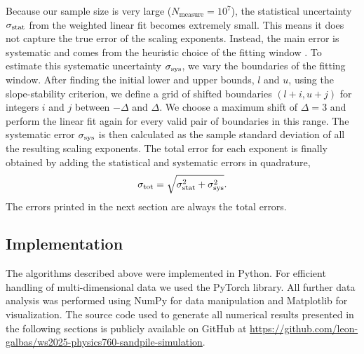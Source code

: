 Because our sample size is very large ($N_\mathrm{measure}=10^{7}$), the statistical uncertainty $\sigma_{\mathrm{stat}}$ from the weighted linear fit becomes extremely small. This means it does not capture the true error of the scaling exponents. Instead, the main error is systematic and comes from the heuristic choice of the fitting window \cite{pruessner2012numerical}. To estimate this systematic uncertainty $\sigma_{\mathrm{sys}}$, we vary the boundaries of the fitting window. After finding the initial lower and upper bounds, $l$ and $u$, using the slope-stability criterion, we define a grid of shifted boundaries $(l+i, u+j)$ for integers $i$ and $j$ between $-\Delta$ and $\Delta$. We choose a maximum shift of $\Delta=3$ and perform the linear fit again for every valid pair of boundaries in this range. The systematic error $\sigma_{\mathrm{sys}}$ is then calculated as the sample standard deviation of all the resulting scaling exponents. The total error for each exponent is finally obtained by adding the statistical and systematic errors in quadrature,
\begin{equation}
    \sigma_{\mathrm{tot}}=\sqrt{\sigma_{\mathrm{stat}}^{2}+\sigma_{\mathrm{sys}}^{2}}.
\end{equation}
The errors printed in the next section are always the total errors.

\subsection*{Implementation}
The algorithms described above were implemented in Python. For efficient handling of multi-dimensional data we used the PyTorch \cite{paszke2019pytorch} library. All further data analysis was performed using NumPy \cite{harris2020array} for data manipulation and Matplotlib \cite{hunter2007matplotlib} for visualization. The source code used to generate all numerical results presented in the following sections is publicly available on GitHub at \href{https://github.com/leon-galbas/ws2025-physics760-sandpile-simulation}{https://github.com/leon-galbas/ws2025-physics760-sandpile-simulation}.
